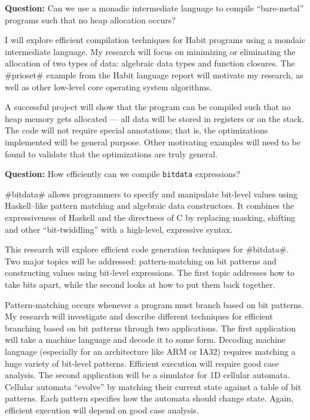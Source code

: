 \documentclass[11pt]{article}
\newcommand{\Ques}[1]{\noindent%
\textbf{Question:} #1}
\begin{document}
\VerbatimFootnotes
\DefineShortVerb{\#}
\doublespacing

\Ques{Can we use a monadic intermediate language to compile
  ``bare-metal'' programs such that no heap allocation occurs?}

\bigskip

I will explore efficient compilation techniques for Habit programs
using a mondaic intermediate language. My research will focus on
minimizing or eliminating the allocation of two types of data:
algebraic data types and function closures. The #prioset# example from
the Habit language report will motivate my research, as well as other
low-level core operating system algorithms.

A successful project will show that the program can be compiled such
that no heap memory gets allocated --- all data will be stored in
registers or on the stack. The code will not require special
annotations; that is, the optimizations implemented will be general
purpose. Other motivating examples will need to be found to validate
that the optimizations are truly general.

\bigskip

\Ques{How efficiently can we compile \Verb=bitdata= expressions?}

#bitdata# allows programmers to specify and manipulate bit-level
values using Haskell--like pattern matching and algebraic data
constructors. It combines the expressiveness of Haskell and the
directness of C by replacing masking, shifting and other
``bit-twiddling'' with a high-level, expressive syntax. 

This research will explore efficient code generation techniques for
#bitdata#. Two major topics will be addressed: pattern-matching on bit
patterns and constructing values using bit-level expressions. The first topic
addresses how to take bits apart, while the second looks at how to put
them back together.

Pattern-matching occurs whenever a program must branch based on bit
patterns. My research will investigate and describe different
techniques for efficient branching based on bit patterns through two
applications. The first application will take a machine language and
decode it to some form. Decoding machine language (especially for an
architecture like ARM or IA32) requires matching a huge variety of
bit-level patterns. Efficient execution will require good case
analysis. The second application will be a simulator for 1D cellular
automata. Cellular automata ``evolve'' by matching their current state
against a table of bit patterns. Each pattern specifies how the
automata should change state. Again, efficient execution will depend
on good case analysis.
\end{document}
